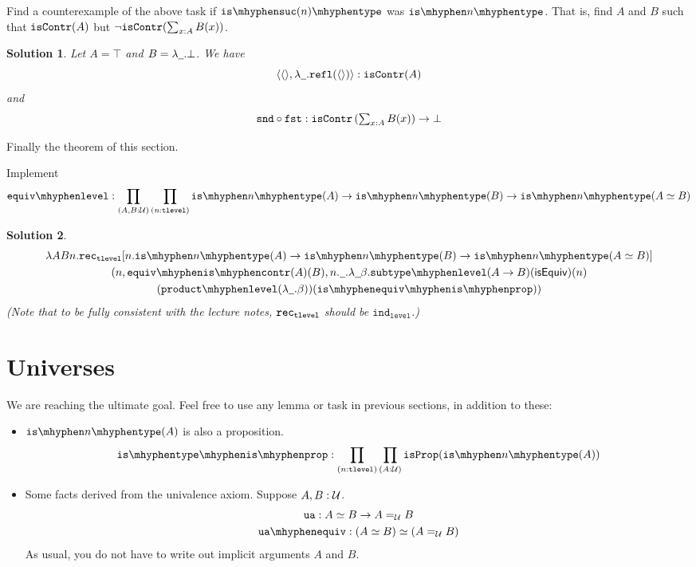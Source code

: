 \documentclass[12pt]{article}
\newcommand{\cut}[1]{}
\newcommand{\marksolution}[1]{\color{FireBrick}#1\normalcolor}%
\newcommand{\marksolution}[1]{\cut{#1}}%
\theoremstyle{plain}
\newtheorem*{solution}{Solution}
\begin{document}
\begin{bonus}
  Find a counterexample of the above task if $\istype{\suc(n)}$ was $\istype{n}$.
  That is, find $A$ and $B$ such that $\mathtt{isContr}(A)$ but $\neg \mathtt{isContr}(\sum_{x:A}B(x))$.
\end{bonus}
\marksolution{
  \begin{solution}
    Let $A = \top$ and $B = \lambda\underline{\hspace{0.5em}}.\bot$.
    We have
    \[
      \langle \langle\rangle,\lambda\underline{\hspace{0.5em}}.\mathtt{refl}(\langle\rangle)\rangle:\mathtt{isContr}(A)
    \]
    and
    \[
      \textstyle
      \mathtt{snd} \mathbin{\circ} \mathtt{fst} : \mathtt{isContr}\left(\sum_{x:A}B(x)\right) \to \bot
    \]
  \end{solution}
}

Finally the theorem of this section.
\begin{task} Implement
  \[
    \equivlevel :
    \prod_{(A,B:\U)}
    \prod_{(n:\tlevel)}
    \istype{n}(A) \to \istype{n}(B) \to \istype{n}(A \eqv B)
  \]
\end{task}
\marksolution{
  \begin{solution}
    \begin{multline*}
      \lambda ABn.\trec[
        n.\istype{n}(A) \to \istype{n}(B) \to \istype{n}(A \eqv B)
      ]
      \\
      (n,\equiviscontr(A)(B),n.\dummy.\lambda\dummy\beta.
      \subtypelevel(A\to B)(\isequiv)(n)
      \\
      (\productlevel(\lambda\dummy.\beta))(\isequivisprop))
    \end{multline*}
    (Note that to be fully consistent with the lecture notes, $\mathtt{rec}_{\mathtt{tlevel}}$ should be $\mathtt{ind}_\mathtt{level}$.)
  \end{solution}
}

\section{Universes}

We are reaching the ultimate goal.
Feel free to use any lemma or task in previous sections, in addition to these:
\begin{itemize}
  \item $\istype{n}(A)$ is also a proposition.
    \[
      \istypeisprop :
      \prod_{(n:\tlevel)}
      \prod_{(A:\U)}
      \isprop(\istype{n}(A))
    \]
  \item
    Some facts derived from the univalence axiom.
    Suppose $A, B : \mathcal{U}$.
    \begin{gather*}
      \ua : A \eqv B \to A =_\U B
      \\
      \uaequiv : (A \eqv B) \eqv (A =_\U B)
    \end{gather*}
    As usual, you do not have to write out implicit arguments $A$ and $B$.
\end{itemize}
\end{document}
